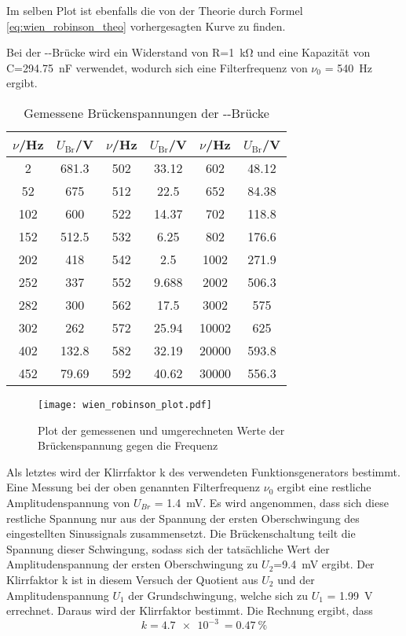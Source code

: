 Im selben Plot ist ebenfalls die von der Theorie durch Formel \eqref{eq:wien_robinson_theo} vorhergesagten Kurve zu finden.

Bei der --Brücke wird ein Widerstand von R=\SI{1}{\kilo\ohm} und eine Kapazität von C=\SI{294.75}{\nano\farad} verwendet, wodurch sich eine Filterfrequenz von $\nu_0$ = \SI{540}{\hertz} ergibt.
%
\begin{table}[]
  \centering
  \begin{tabular}{SS|SS|SS}
     \toprule
{$\nu$/}\si{\hertz}&{$U_\text{Br}$/}\si{\volt}&{$\nu$/}\si{\hertz}&{$U_\text{Br}$/}\si{\volt}&{$\nu$/}\si{\hertz}&{$U_\text{Br}$/}\si{\volt}\\
&681.3&502&33.12&602&48.12\\
52&675&512&22.5&652&84.38\\
102	&600&522	&14.37&702&118.8\\
152&512.5&532&6.25&802&176.6\\
202&418&542&2.5&1002&271.9\\
252&337&552&9.688&2002&506.3\\
282&300&562&17.5&3002&575\\
302&262&572&25.94&10002&625\\
402	&132.8&582&32.19&20000&593.8\\
452&79.69&592&40.62&30000&556.3\\
    \bottomrule
  \end{tabular}
  \caption{Gemessene Brückenspannungen der --Brücke}
  \label{tab:wien_robinson}
\end{table}
%
\begin{figure}
\centering
\texttt{[image: wien\_robinson\_plot.pdf]}
\caption{Plot der gemessenen und umgerechneten Werte der Brückenspannung gegen die Frequenz}
\label{fig:wien_robinson_plot}
\end{figure}
%

Als letztes wird der Klirrfaktor k des verwendeten Funktionsgenerators bestimmt.
Eine Messung bei der oben genannten Filterfrequenz $\nu_0$ ergibt eine restliche Amplitudenspannung von $U_{Br}$ = \SI{1.4}{\milli\volt}. Es wird angenommen, dass sich diese restliche Spannung nur aus der Spannung der ersten Oberschwingung des eingestellten Sinussignals zusammensetzt. Die Brückenschaltung teilt die Spannung dieser Schwingung, sodass sich der tatsächliche Wert der Amplitudenspannung der ersten Oberschwingung zu $U_2$=\SI{9.4}{\milli\volt} ergibt. 
Der Klirrfaktor k ist in diesem Versuch der Quotient aus $U_2$ und der Amplitudenspannung $U_1$ der Grundschwingung, welche sich zu $U_1$ = \SI{1.99}{\volt} errechnet.
Daraus wird der Klirrfaktor bestimmt. Die Rechnung ergibt, dass
%
\begin{equation*}
k = \SI{4.7e-3}{} = \SI{0.47}{\percent}
\end{equation*}
%